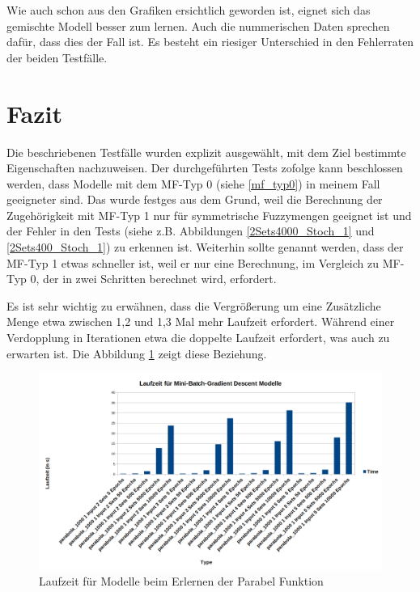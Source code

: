 {Wie auch schon aus den Grafiken ersichtlich geworden ist, eignet sich das gemischte Modell besser zum lernen. Auch die nummerischen Daten sprechen dafür, dass dies der Fall ist. Es besteht ein riesiger Unterschied in den Fehlerraten der beiden Testfälle.

\section{Fazit}

Die beschriebenen Testfälle wurden explizit ausgewählt, mit dem Ziel bestimmte Eigenschaften nachzuweisen. Der durchgeführten Tests zofolge kann beschlossen werden, dass Modelle mit dem MF-Typ 0 (siehe \ref{mf_typ0}) in meinem Fall geeigneter sind. Das wurde festges aus dem Grund, weil die Berechnung der Zugehörigkeit mit MF-Typ 1 nur für symmetrische Fuzzymengen geeignet ist und der Fehler in den Tests (siehe z.B. Abbildungen \ref{2Sets4000_Stoch_1} und \ref{2Sets400_Stoch_1}) zu erkennen ist. Weiterhin sollte genannt werden, dass der MF-Typ 1 etwas schneller ist, weil er nur eine Berechnung, im Vergleich zu MF-Typ 0, der in zwei Schritten berechnet wird, erfordert.

Es ist sehr wichtig zu erwähnen, dass die Vergrößerung um eine Zusätzliche Menge etwa zwischen 1,2 und 1,3 Mal mehr Laufzeit erfordert. Während einer Verdopplung in Iterationen etwa die doppelte Laufzeit erfordert, was auch zu erwarten ist. Die Abbildung \ref{mini_batch_parabel_grafik} zeigt diese Beziehung.

\begin{figure}[htbp]
	\centering
	\includegraphics[width=1\textwidth]{images/charts/Mini-BatchGradientTimeParabola_bold.png}
	\caption{Laufzeit für Modelle beim Erlernen der Parabel Funktion}
	\label{mini_batch_parabel_grafik}
\end{figure}

}
